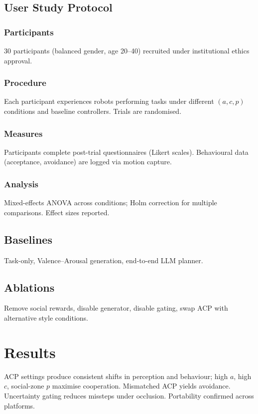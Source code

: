 \documentclass[journal]{IEEEtran}
\begin{document}
\subsection{User Study Protocol}
\subsubsection{Participants}
30 participants (balanced gender, age 20--40) recruited under institutional ethics approval.
\subsubsection{Procedure}
Each participant experiences robots performing tasks under different $(a, c, p)$ conditions and baseline controllers. Trials are randomised.
\subsubsection{Measures}
Participants complete post-trial questionnaires (Likert scales). Behavioural data (acceptance, avoidance) are logged via motion capture.
\subsubsection{Analysis}
Mixed-effects ANOVA across conditions; Holm correction for multiple comparisons. Effect sizes reported.

\subsection{Baselines}
Task-only, Valence--Arousal generation, end-to-end LLM planner.

\subsection{Ablations}
Remove social rewards, disable generator, disable gating, swap ACP with alternative style conditions.

\section{Results}\label{sec:results}
ACP settings produce consistent shifts in perception and behaviour; high $a$, high $c$, social-zone $p$ maximise cooperation. Mismatched ACP yields avoidance. Uncertainty gating reduces missteps under occlusion. Portability confirmed across platforms.
\end{document}
